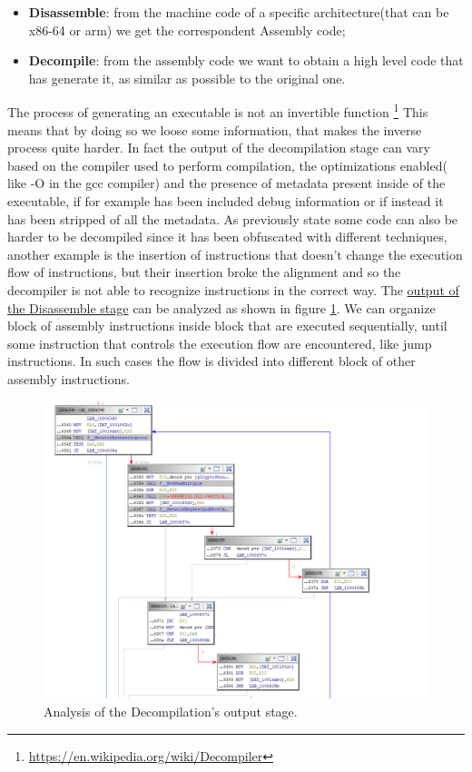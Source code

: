 \documentclass{article}
\begin{document}
\begin{itemize}
    \item \textbf{Disassemble}: from the machine code of a specific architecture(that can be x86-64 or arm) we get the correspondent Assembly code;
    \item \textbf{Decompile}: from the assembly code we want to obtain a high level code that has generate it, as similar as possible to the original one.
\end{itemize}
The process of generating an executable is not an invertible function \footnote{\url{https://en.wikipedia.org/wiki/Decompiler}} This means that by doing so we loose some information, that makes the inverse process quite harder.
In fact the output of the decompilation stage can vary based on the compiler used to perform compilation, the optimizations enabled( like -O in the gcc compiler) and the presence of metadata present inside of the executable, if for example has been included debug information or if instead it has been stripped of all the metadata.
As previously state some code can also be harder to be decompiled since it has been obfuscated with different techniques, another example is the insertion of instructions that doesn't change the execution flow of instructions, but their insertion broke the alignment and so the decompiler is not able to recognize instructions in the correct way.
The \underline{output of the Disassemble stage} can be analyzed as shown in figure \ref{fig:decompilationoutput}. We can organize block of assembly instructions inside block that are executed sequentially, until some instruction that controls the execution flow are encountered, like jump instructions.
In such cases the flow is divided into different block of other assembly instructions.
\begin{figure}[htp]
    \centering
    \includegraphics[width=1\textwidth]{images/graphview.png}
    \caption{Analysis of the Decompilation's output stage.}
    \label{fig:decompilationoutput}
\end{figure}
\end{document}
